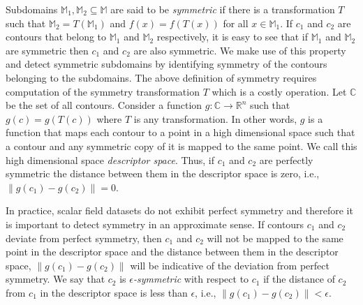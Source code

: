 \documentclass[review,journal]{vgtc}         %
\begin{document}
Subdomains $\mathbb{M}_1, \mathbb{M}_2 \subseteq \mathbb{M}$ are said to be \emph{symmetric} 
if there is a transformation $T$ such that ${\mathbb{M}_2=T(\mathbb{M}_1)}$ and 
${f(x)=f(T(x))}$ for all $x \in \mathbb{M}_1$. If $c_1$ and $c_2$ are contours that belong to 
$\mathbb{M}_1$ and $\mathbb{M}_2$ respectively, it is easy to see that if $\mathbb{M}_1$ and 
$\mathbb{M}_2$ are symmetric then $c_1$ and $c_2$ are also symmetric. We make use of this property
and detect symmetric subdomains by identifying symmetry of the contours belonging to
the subdomains. The above definition of symmetry requires computation of the symmetry 
transformation $T$ which is a costly operation. Let $\mathbb{C}$ be the set of all contours. 
Consider a function $g : \mathbb{C} \rightarrow \mathbb{R}^n$ such that $g(c) = g(T(c))$
where $T$ is any transformation. In other words, $g$ is a function that maps each
contour to a point in a high dimensional space such that a contour and any symmetric
copy of it is mapped to the same point. We call this high dimensional space
\emph{descriptor space}. Thus, if $c_1$ and $c_2$ are perfectly symmetric
the distance between them in the descriptor space is zero, i.e., 
$\lVert g(c_1)-g(c_2) \rVert = 0$. 

In practice, scalar field datasets do not exhibit perfect symmetry and therefore
it is important to detect symmetry in an approximate sense. If contours $c_1$ and 
$c_2$ deviate from perfect symmetry, then $c_1$ and $c_2$ will not be mapped
to the same point in the descriptor space and the distance between
them in the descriptor space, $\lVert g(c_1)-g(c_2) \rVert$ will be indicative
of the deviation from perfect symmetry. We say that $c_2$ is \emph{$\epsilon$-symmetric} 
with respect to $c_1$ if the distance of $c_2$ from $c_1$ in the descriptor 
space is less than $\epsilon$, i.e., $\lVert g(c_1)-g(c_2) \rVert < \epsilon$.
\end{document}
